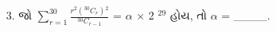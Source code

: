 \documentclass[12pt]{article}
\begin{document}
\begin{enumerate}[leftmargin=*]
\item[3.] જો \ensuremath{\displaystyle\sum_{r=1}^{30} \ensuremath{\frac{r \ensuremath{^{2}} \ensuremath{\left( \ensuremath{{}^{30}C_{r}} \right)} \ensuremath{^{2}}}{\ensuremath{{}^{30}C_{r-1}}}}} = \ensuremath{\alpha} \ensuremath{\times} 2 \ensuremath{^{29}} હોય, તો \ensuremath{\alpha} = \_\_\_\_.\\[0.2em] \text{[1 marks]}


\end{enumerate}
\end{document}
